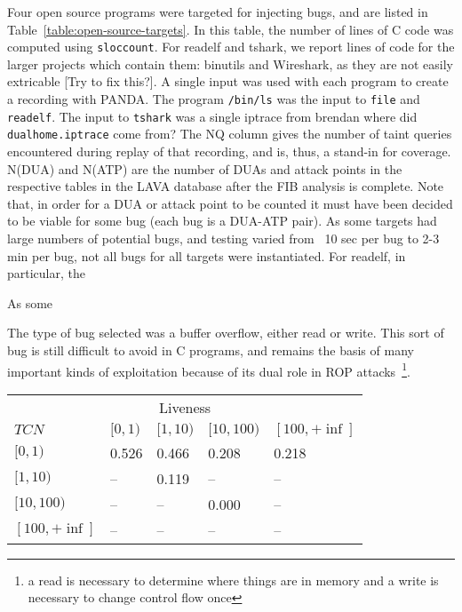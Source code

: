 Four open source programs were targeted for injecting bugs, and are listed in Table~\ref{table:open-source-targets}.
In this table, the number of lines of C code was computed using \verb+sloccount+.  
For readelf and tshark, we report lines of code for the larger projects which contain them: binutils and Wireshark, as they are not easily extricable [Try to fix this?].
A single input was used with each program to create a recording with PANDA.
The program \verb+/bin/ls+ was the input to \verb+file+ and \verb+readelf+.
The input to \verb+tshark+ was a single iptrace from brendan where did \verb+dualhome.iptrace+ come from? 
The NQ column gives the number of taint queries encountered during replay of that recording, and is, thus, a stand-in for coverage. 
N(DUA) and N(ATP) are the number of DUAs and attack points in the respective tables in the LAVA database after the FIB analysis is complete.
Note that, in order for a DUA or attack point to be counted it must have been decided to be viable for some bug (each bug is a DUA-ATP pair).
As some targets had large numbers of potential bugs, and testing varied from ~10 sec per bug to 2-3 min per bug, not all bugs for
all targets were instantiated.  
For readelf, in particular, the 

As some 

The type of bug selected was a buffer overflow, either read or write.
This sort of bug is still difficult to avoid in C programs, and remains the basis of many important kinds of exploitation because of its dual role in ROP attacks~\footnote{a read is necessary to determine where things are in memory and a write is necessary to change control flow once}.







\begin{table}
\centering
\begin{tabular}{l|l|l|l|l} 
 & \multicolumn{3}{c}{Liveness} &  \\  
$TCN$ &         $[0,1)$ & $[1,10)$ & $[10,100)$ & $[100,+\inf]$ \\  \hline 
$[0,1)$ &       0.526   & 0.466    & 0.208      & 0.218 \\
$[1,10)$ &      --      & 0.119    & --         & --    \\
$[10,100)$ &    --      & --       & 0.000      & --    \\
$[100,+\inf]$ & --      & --       & --         & -- \\ 
\end{tabular}
\end{table}

